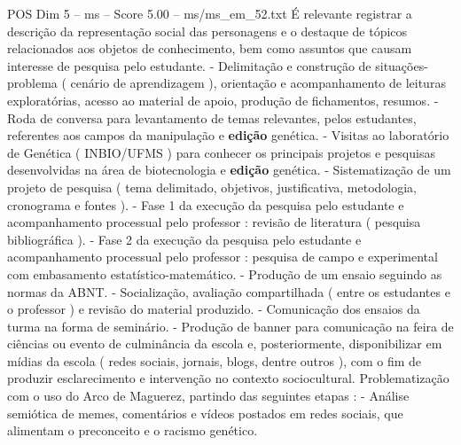 \begin{textsample}{POS Dim 5 – ms – Score 5.00 – ms/ms\_em\_52.txt}
É relevante registrar a descrição da representação social das personagens e o destaque de tópicos relacionados aos objetos de conhecimento, bem como assuntos que causam interesse de pesquisa pelo estudante. - Delimitação e construção de situações-problema ( cenário de aprendizagem ), orientação e acompanhamento de leituras exploratórias, acesso ao material de apoio, produção de fichamentos, resumos. - Roda de conversa para levantamento de temas relevantes, pelos estudantes, referentes aos campos da manipulação e \textbf{edição} genética. - Visitas ao laboratório de Genética ( INBIO/UFMS ) para conhecer os principais projetos e pesquisas desenvolvidas na área de biotecnologia e \textbf{edição} genética. - Sistematização de um projeto de pesquisa ( tema delimitado, objetivos, justificativa, metodologia, cronograma e fontes ). - Fase 1 da execução da pesquisa pelo estudante e acompanhamento processual pelo professor : revisão de literatura ( pesquisa bibliográfica ). - Fase 2 da execução da pesquisa pelo estudante e acompanhamento processual pelo professor : pesquisa de campo e experimental com embasamento estatístico-matemático. - Produção de um ensaio seguindo as normas da ABNT. - Socialização, avaliação compartilhada ( entre os estudantes e o professor ) e revisão do material produzido. - Comunicação dos ensaios da turma na forma de seminário. - Produção de banner para comunicação na feira de ciências ou evento de culminância da escola e, posteriormente, disponibilizar em mídias da escola ( redes sociais, jornais, blogs, dentre outros ), com o fim de produzir esclarecimento e intervenção no contexto sociocultural.
Problematização com o uso do Arco de Maguerez, partindo das seguintes etapas : - Análise semiótica de memes, comentários e vídeos postados em redes sociais, que alimentam o preconceito e o racismo genético.

\end{textsample}

